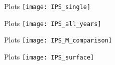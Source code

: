 \begin{frame}{Plots}
	\texttt{[image: IPS\_single]}
\end{frame}

\begin{frame}{Plots}
	\texttt{[image: IPS\_all\_years]}
\end{frame}

\begin{frame}{Plots}
	\texttt{[image: IPS\_M\_comparison]}
\end{frame}

\begin{frame}{Plots}
	\texttt{[image: IPS\_surface]}
\end{frame}
